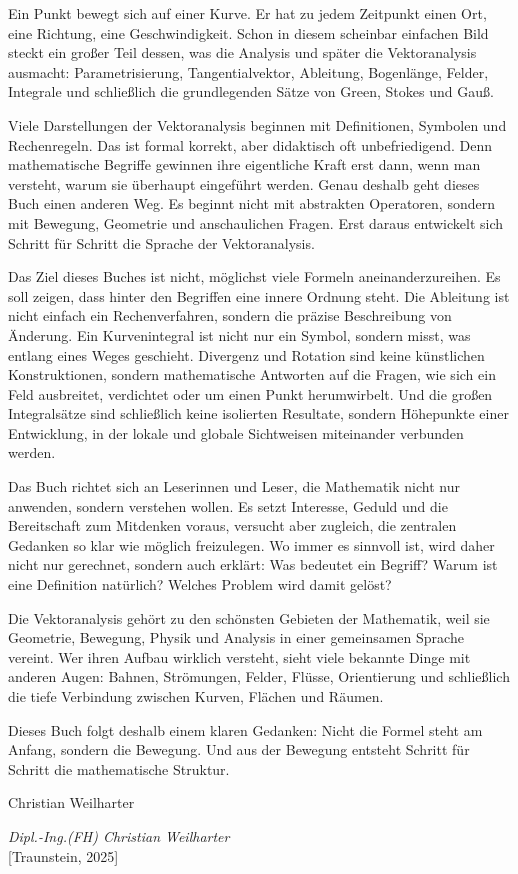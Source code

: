 Ein Punkt bewegt sich auf einer Kurve.
Er hat zu jedem Zeitpunkt einen Ort, eine Richtung, eine Geschwindigkeit.
Schon in diesem scheinbar einfachen Bild steckt ein großer Teil dessen, was die Analysis und später die Vektoranalysis ausmacht:
Parametrisierung, Tangentialvektor, Ableitung, Bogenlänge, Felder, Integrale und schließlich die grundlegenden Sätze von Green, Stokes und Gauß.

Viele Darstellungen der Vektoranalysis beginnen mit Definitionen, Symbolen und Rechenregeln.
Das ist formal korrekt, aber didaktisch oft unbefriedigend.
Denn mathematische Begriffe gewinnen ihre eigentliche Kraft erst dann, wenn man versteht, warum sie überhaupt eingeführt werden.
Genau deshalb geht dieses Buch einen anderen Weg.
Es beginnt nicht mit abstrakten Operatoren, sondern mit Bewegung, Geometrie und anschaulichen Fragen.
Erst daraus entwickelt sich Schritt für Schritt die Sprache der Vektoranalysis.

Das Ziel dieses Buches ist nicht, möglichst viele Formeln aneinanderzureihen.
Es soll zeigen, dass hinter den Begriffen eine innere Ordnung steht.
Die Ableitung ist nicht einfach ein Rechenverfahren, sondern die präzise Beschreibung von Änderung.
Ein Kurvenintegral ist nicht nur ein Symbol, sondern misst, was entlang eines Weges geschieht.
Divergenz und Rotation sind keine künstlichen Konstruktionen, sondern mathematische Antworten auf die Fragen,
wie sich ein Feld ausbreitet, verdichtet oder um einen Punkt herumwirbelt.
Und die großen Integralsätze sind schließlich keine isolierten Resultate, sondern Höhepunkte einer Entwicklung,
in der lokale und globale Sichtweisen miteinander verbunden werden.

Das Buch richtet sich an Leserinnen und Leser, die Mathematik nicht nur anwenden, sondern verstehen wollen.
Es setzt Interesse, Geduld und die Bereitschaft zum Mitdenken voraus,
versucht aber zugleich, die zentralen Gedanken so klar wie möglich freizulegen.
Wo immer es sinnvoll ist, wird daher nicht nur gerechnet, sondern auch erklärt:
Was bedeutet ein Begriff?
Warum ist eine Definition natürlich?
Welches Problem wird damit gelöst?

Die Vektoranalysis gehört zu den schönsten Gebieten der Mathematik,
weil sie Geometrie, Bewegung, Physik und Analysis in einer gemeinsamen Sprache vereint.
Wer ihren Aufbau wirklich versteht, sieht viele bekannte Dinge mit anderen Augen:
Bahnen, Strömungen, Felder, Flüsse, Orientierung und schließlich die tiefe Verbindung zwischen Kurven, Flächen und Räumen.

Dieses Buch folgt deshalb einem klaren Gedanken:
Nicht die Formel steht am Anfang, sondern die Bewegung.
Und aus der Bewegung entsteht Schritt für Schritt die mathematische Struktur.

\bigskip
\noindent
Christian Weilharter






\begin{flushright}
	\textit{Dipl.-Ing.(FH) Christian Weilharter} \\
	\vspace{0.5em}
	[Traunstein, 2025]
\end{flushright}


